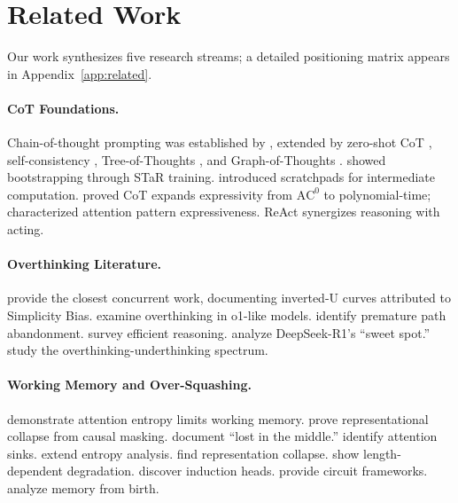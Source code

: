 \documentclass{article}
\theoremstyle{plain}
\theoremstyle{definition}
\theoremstyle{remark}
\begin{document}

\section{Related Work}
\label{sec:related}

Our work synthesizes five research streams; a detailed positioning matrix appears in Appendix~\ref{app:related}.

\paragraph{CoT Foundations.} Chain-of-thought prompting was established by \citet{wei2022chain}, extended by zero-shot CoT \citep{kojima2022large}, self-consistency \citep{wang2023selfconsistency}, Tree-of-Thoughts \citep{yao2023tree}, and Graph-of-Thoughts \citep{besta2024graph}. \citet{zelikman2022star} showed bootstrapping through STaR training. \citet{nye2021improving} introduced scratchpads for intermediate computation. \citet{li2024chain} proved CoT expands expressivity from $\text{AC}^0$ to polynomial-time; \citet{feng2023expressiveness} characterized attention pattern expressiveness. ReAct \citep{xu2023react} synergizes reasoning with acting.

\paragraph{Overthinking Literature.} \citet{wu2025more} provide the closest concurrent work, documenting inverted-U curves attributed to Simplicity Bias. \citet{chen2024overthinking} examine overthinking in o1-like models. \citet{wang2025underthinking} identify premature path abandonment. \citet{sui2025stop} survey efficient reasoning. \citet{marjanovic2025thoughtology} analyze DeepSeek-R1's ``sweet spot.'' \citet{su2025between} study the overthinking-underthinking spectrum.

\paragraph{Working Memory and Over-Squashing.} \citet{gong2024attention} demonstrate attention entropy limits working memory. \citet{barbero2024oversquash} prove representational collapse from causal masking. \citet{liu2023lost} document ``lost in the middle.'' \citet{xiao2024efficient} identify attention sinks. \citet{zhang2024attention} extend entropy analysis. \citet{aksenov2025representation} find representation collapse. \citet{levy2024same} show length-dependent degradation. \citet{olsson2022context} discover induction heads. \citet{elhage2021mathematical} provide circuit frameworks. \citet{bietti2024birth} analyze memory from birth.
\end{document}
